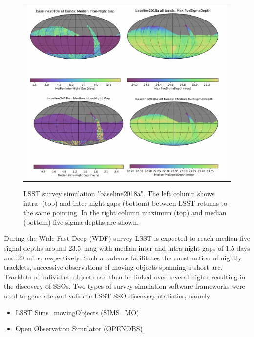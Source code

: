 \begin{figure}[tb!]
\begin{tabular}{c}
\includegraphics[width=1\linewidth]{figs/baseline2018a.png}
\end{tabular}
\caption{LSST survey simulation "baseline2018a". The left column shows intra- (top) and inter-night gaps (bottom) between \gls{LSST} returns to the same pointing. In the right column maximum (top) and median (bottom) five sigma depths are shown.}
\label{fig:gaps}       %
\end{figure}
%
During the \gls{Wide-Fast-Deep} (WDF) survey \gls{LSST} is expected to reach median five signal depths around \SI{23.5}{mag} with median inter and intra-night gaps of 1.5 days and 20 mins, respectively. Such a cadence facilitates the construction of nightly tracklets, successive observations of
moving objects spanning a short arc. Tracklets of individual objects can then be linked over several nights resulting in the discovery of SSOs.
Two types of survey simulation software frameworks were used to generate and validate \gls{LSST} \gls{SSO} discovery statistics, namely
\begin{itemize}
\item \href{https://epyc.astro.washington.edu/~lynnej/sims_movingObjects/lsst.sims.movingObjects.html}{LSST Sims\_movingObjects (SIMS\_MO)}
\item \href{https://github.com/eggls6/openobs}{Open Observation Simulator (OPENOBS)}
\end{itemize}
